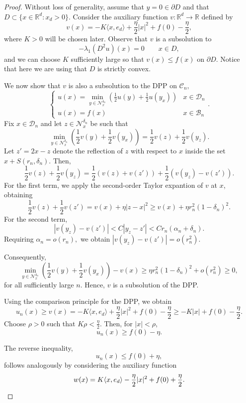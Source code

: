 \documentclass[11pt]{amsart}
\theoremstyle{definition}
\theoremstyle{remark}
\numberwithin{equation}{section}
\newcommand{\R}{{\mathbb R}}
\newcommand{\Domain}{\mathcal{D}}
\newcommand{\B}{\mathcal{B}}
\newcommand{\C}{{\mathcal C}}
\newcommand{\Nc}{{\mathcal N}}
\begin{document}
\begin{proof}
Without loss of generality, assume that $y=0\in\partial D$ and that $D\subset\{x\in\R^d : x_d>0\}$. 
Consider the auxiliary function $v:\R^d\rightarrow\R$ defined by 
\[
v(x)=-K\langle x,e_d\rangle +\frac{\eta}{2} |x|^2+f(0)-\frac{\eta}{2},
\]
where $K>0$ will be chosen later. 
Observe that $v$ is a subsolution to 
\[
-\lambda_1(D^2 u)(x)=0 \qquad x\in D,
\]
and we can choose $K$ sufficiently large so that $v(x)\le f(x)$ on $\partial D$.
Notice that here we are using that $D$ is strictly convex.
 
We now show that $v$ is also a subsolution to the DPP on $\C_n,$
\[
\begin{cases}
	\displaystyle u(x)=\min\limits_{y\in \Nc_x^{\delta_n}} 
	\left(
	\frac{1}{2} 
	u(y) 
	+
	\frac{1}{2}
	u(y_x) 
	\right)
	& x\in \Domain_n \\
	u(x)=f(x)
	& x\in \B_n
\end{cases} 
.
\]
Fix $x\in \Domain_n$ and let $z\in\Nc_x^{\delta_n}$ be such that
\[
\min\limits_{y\in \Nc_x^{\delta_n}} 
\left(
\frac{1}{2} 
v(y) 
+
\frac{1}{2}
v(y_x) 
\right)=\frac{1}{2}v(z)+\frac{1}{2}v(y_z).
\] 
Let $z'=2x-z$ denote the reflection of $z$ with respect to $x$ inside the set $x+S(r_n,\delta_n)$. 
Then,
\[
\frac{1}{2}v(z)+\frac{1}{2}v(y_z)
=
\frac{1}{2}\left(v(z)+v(z')\right)+\frac{1}{2}\left(v(y_z)-v(z')\right).
\]
For the first term, we apply the second-order Taylor expantion of $v$ at $x$, obtaining
\[
\frac{1}{2}v(z)+\frac{1}{2}v(z')=v(x)+\eta|z-x|^2\ge v(x)+\eta r_n^2(1-\delta_n)^2.
\]
For the second term,
\[
|v(y_z)-v(z')|<C|y_z-z'| <Cr_n (\alpha_n+\delta_n).
\]
Requiring $\alpha_n = o(r_n),$ we obtain $|v(y_z)-v(z')| = o(r_n^2)$.

Consequently,
\[
\min\limits_{y\in \Nc_x^{\delta_n}} 
\left(
\frac{1}{2} 
v(y) 
+
\frac{1}{2}
v(y_x) 
\right)- v(x)\ge \eta r_n^2(1-\delta_n)^2+o(r_n^2)\ge 0,
\]
for all sufficiently large $n$.
Hence, $v$ is a subsolution of the DPP.

Using the comparison principle for the DPP, we obtain
\[
u_n(x)\ge v(x)
=
-K\langle x,e_d\rangle+\frac{\eta}{2}|x|^2+f(0)-\frac{\eta}{2}\ge -K|x|+f(0)-\frac{\eta}{2}
.
\]
Choose $\rho>0$ such that $K\rho<\frac{\eta}{2}$. 
Then, for $|x|<\rho$, 
\[
u_n(x)\ge f(0)-\eta.
\]

The reverse inequality,
\[
u_n(x)\le f(0)+\eta,
\]
follows analogously by considering the auxiliary function
\[
w(x)=
K\langle x,e_d\rangle -\frac{\eta}{2} |x|^2+f(0)+\frac{\eta}{2}. \qedhere
\]
\end{proof} 
\end{document}
